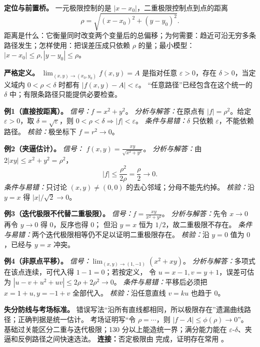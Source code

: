 
\begin{knowledgeBox}
\textbf{定位与前置桥。}
一元极限控制的是 \(|x-x_0|\)，二重极限控制点到点的距离
\[
\rho=\sqrt{(x-x_0)^2+(y-y_0)^2}.
\]
距离是什么：它衡量同时改变两个变量后的总偏移；为何需要：趋近可沿无穷多条
路径发生；怎样使用：把误差压成只依赖 \(\rho\) 的量；最小模型：
\(|x-x_0|\le\rho,|y-y_0|\le\rho\)。

\textbf{严格定义。}
\(\lim_{(x,y)\to(x_0,y_0)}f(x,y)=A\) 是指对任意
\(\varepsilon>0\)，存在 \(\delta>0\)，当定义域内
\(0<\rho<\delta\) 时都有 \(|f(x,y)-A|<\varepsilon\)。
“任意路径”已经包含在这个统一的 \(\delta\) 中；有限条路径只能提供必要检查。

\textbf{例1（直接按距离）。}
\emph{信号：}\(f=x^2+y^2\)。
\emph{分析与解答：}在原点有 \(|f|=\rho^2\)。给定 \(\varepsilon>0\)，取
\(\delta=\sqrt{\varepsilon}\)，则 \(0<\rho<\delta\Rightarrow|f|<\varepsilon\)。
\emph{条件与易错：}\(\delta\) 只依赖 \(\varepsilon\)，不能依赖路径。
\emph{核验：}极坐标下 \(f=r^2\to0\)。

\textbf{例2（夹逼估计）。}
\emph{信号：}
\(\displaystyle f(x,y)=\frac{xy}{\sqrt{x^2+y^2}}\)。
\emph{分析与解答：}由 \(2|xy|\le x^2+y^2=\rho^2\)，
\[
|f|\le\frac{\rho^2}{2\rho}=\frac{\rho}{2}\to0.
\]
\emph{条件与易错：}只讨论 \((x,y)\ne(0,0)\) 的去心邻域；分母不能先约掉。
\emph{核验：}沿 \(y=x\) 得 \(|x|/\sqrt2\to0\)。

\textbf{例3（迭代极限不代替二重极限）。}
\emph{信号：}\(\displaystyle f=\frac{xy}{x^2+y^2}\)。
\emph{分析与解答：}先令 \(x\to0\) 再令 \(y\to0\) 得 \(0\)，反序也得 \(0\)；
但沿 \(y=x\) 恒为 \(1/2\)，故二重极限不存在。
\emph{条件与易错：}两个迭代极限相等仍不足以证明二重极限存在。
\emph{核验：}沿 \(y=0\) 值为 \(0\)，已经与 \(y=x\) 冲突。

\textbf{例4（非原点平移）。}
\emph{信号：}\(\lim_{(x,y)\to(1,-1)}(x^2+xy)\)。
\emph{分析与解答：}多项式在该点连续，可代入得 \(1-1=0\)；若按定义，
令 \(u=x-1,v=y+1\)，误差可估为
\(|u-v+u^2+uv|\le2\rho+2\rho^2\to0\)。
\emph{条件与易错：}平移后必须把 \(x=1+u,y=-1+v\) 全部代入。
\emph{核验：}沿任意直线 \(v=ku\) 也趋于 \(0\)。

\textbf{失分防线与考场标准。}
错误写法“沿所有直线都相同，所以极限存在”遗漏曲线路径；正确判据是统一估计。
考场证明写“令 \(\rho=\cdots\)，则 \(|f-A|\le\phi(\rho)\to0\)”。
基础过关能区分二重与迭代极限；130 分以上能造统一界；满分能力能在
\(\varepsilon\)-\(\delta\)、夹逼和反例路径之间快速选法。
\textbf{连接：}否定极限由
完成，证明存在常用
。
\end{knowledgeBox}

